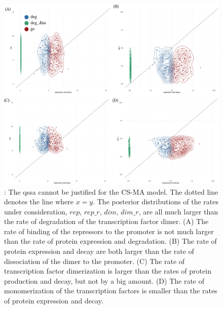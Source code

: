\begin{figure}[htbp]
\begin{center}
\includegraphics[width=\textwidth]{../../chapters/chapterStabilityFinder/images/qssa-cs-sym.png}
\caption[Testing the QSSA assumptions on the mass action models]{ \label{fig:ma_qssa}: The \acrshort{qssa} cannot be justified for the CS-MA model. The dotted line denotes the line where $x = y$. The posterior distributions of the rates under consideration, $rep$, $rep\_r$, $dim$, $dim\_r$, are all much larger than the rate of degradation of the transcription factor dimer. (A) The rate of binding of the repressors to the promoter is not much larger than the rate of protein expression and degradation. (B) The rate of protein expression and decay are both larger than the rate of dissociation of the dimer to the promoter. (C) The rate of transcription factor dimerization is larger than the rates of protein production and decay, but not by a big amount. (D) The rate of monomerization of the transcription factors is smaller than the rates of protein expression and decay.}
\end{center}
\end{figure}
\clearpage



